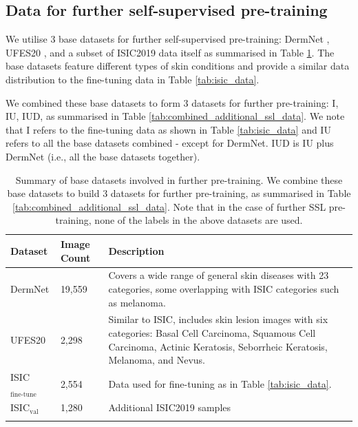 \documentclass[a4paper,fleqn]{cas-dc}
\begin{document}
\subsection{Data for further self-supervised pre-training}
\label{sec:further_pre-training}

We utilise 3 base datasets for further self-supervised pre-training:  DermNet \cite{dermnet,dermnet_kaggle}, UFES20 \cite{pacheco2020pad}, and a subset of ISIC2019 data itself \cite{ISIC2023,andrewmvd2019isic} as summarised in Table \ref{tab:additional_ssl_data}. The base datasets feature different types of skin conditions and provide  a similar data distribution to the fine-tuning data in Table \ref{tab:isic_data}.

We combined these base datasets   to form 3 datasets for further pre-training: I, IU, IUD, as summarised in Table \ref{tab:combined_additional_ssl_data}. We note that I refers to the fine-tuning data as shown in Table \ref{tab:isic_data} and IU refers to all the base datasets combined -  except for DermNet. IUD is IU plus DermNet (i.e., all the base datasets together). 







\begin{table}[htbp!]
\centering
\begin{tabular}{@{}p{2cm}p{2cm}p{8cm}@{}}
\toprule
\textbf{Dataset} & \textbf{Image Count} & \textbf{Description} \\ \midrule
\addlinespace[0.5em]
DermNet & 19,559 & Covers a wide range of general skin diseases with 23 categories, some overlapping with ISIC categories such as melanoma. \\
\addlinespace[0.5em]
UFES20 & 2,298 & Similar to ISIC, includes skin lesion images with six categories: Basal Cell Carcinoma, Squamous Cell Carcinoma, Actinic Keratosis, Seborrheic Keratosis, Melanoma, and Nevus. \\
\addlinespace[0.5em]
ISIC$_{\text{fine-tune}}$ & 2,554 & Data used for fine-tuning as in Table \ref{tab:isic_data}. \\
\addlinespace[0.5em]
ISIC$_{\text{val}}$ & 1,280 & Additional ISIC2019 samples  \\ 
\addlinespace[0.5em]
\bottomrule
\end{tabular}
\caption{Summary of base datasets involved in further pre-training. We combine these base datasets to build 3 datasets for further pre-training, as summarised in Table \ref{tab:combined_additional_ssl_data}.  Note that in the case of further SSL pre-training, none of the labels in the above datasets are used.}
\label{tab:additional_ssl_data}
\end{table}
\end{document}
